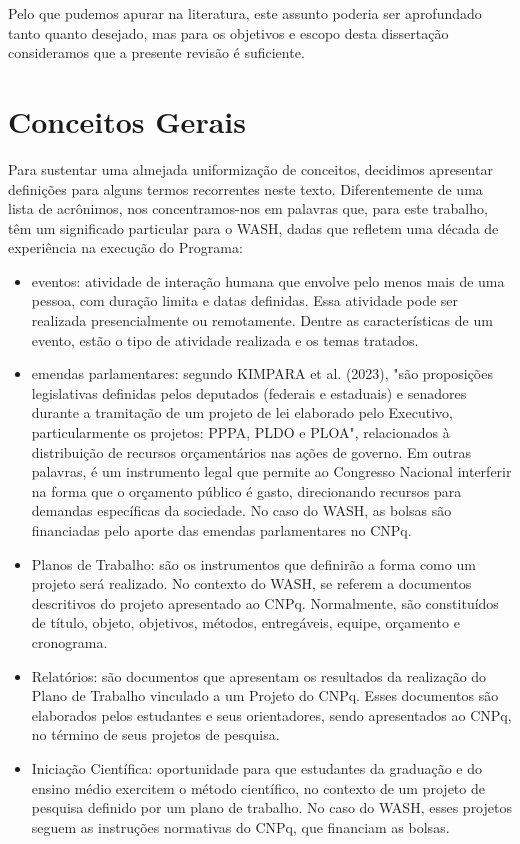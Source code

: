 Pelo que pudemos apurar na literatura, este assunto poderia ser aprofundado tanto quanto desejado, mas para os objetivos e escopo desta dissertação consideramos que a presente revisão é suficiente.

\section[Conceitos Gerais]{Conceitos Gerais}\label{Conceitos Gerais}
Para sustentar uma almejada uniformização de conceitos, decidimos apresentar definições para alguns termos recorrentes neste texto. Diferentemente de uma lista de acrônimos, nos concentramos-nos em palavras que, para este trabalho, têm um significado particular para o  WASH, dadas que refletem uma década de experiência na execução do Programa:


\begin{itemize}
\item eventos: atividade de interação humana que envolve pelo menos mais de uma pessoa, com duração limita e datas definidas. Essa atividade pode ser realizada presencialmente ou remotamente. Dentre as características de um evento, estão o tipo de atividade realizada e os temas tratados.
\item emendas parlamentares: segundo  KIMPARA et al. (2023),  "são proposições legislativas definidas pelos deputados (federais e estaduais) e senadores durante a tramitação de um projeto de lei elaborado pelo Executivo, particularmente os projetos: PPPA, PLDO e PLOA", relacionados à distribuição de recursos orçamentários nas ações de governo. Em outras palavras, é um instrumento legal que permite ao Congresso Nacional interferir na forma que o orçamento público é gasto, direcionando recursos para demandas específicas da sociedade. No caso do WASH, as bolsas são financiadas pelo aporte das emendas parlamentares no CNPq.
\item Planos de Trabalho: são os instrumentos que definirão a forma como um projeto será realizado. No contexto do WASH, se referem a documentos descritivos do projeto apresentado ao CNPq. Normalmente, são constituídos de título, objeto, objetivos, métodos, entregáveis, equipe, orçamento e cronograma.
\item Relatórios: são documentos que apresentam os resultados da realização do Plano de Trabalho vinculado a um Projeto do CNPq. Esses documentos são elaborados pelos estudantes e seus orientadores, sendo apresentados ao CNPq, no término de seus projetos de pesquisa.
\item Iniciação Científica: oportunidade para que estudantes da graduação e do ensino médio exercitem o método científico, no contexto de um projeto de pesquisa definido por um plano de trabalho. No caso do WASH, esses projetos seguem as instruções normativas do CNPq, que financiam as bolsas.
\end{itemize}

